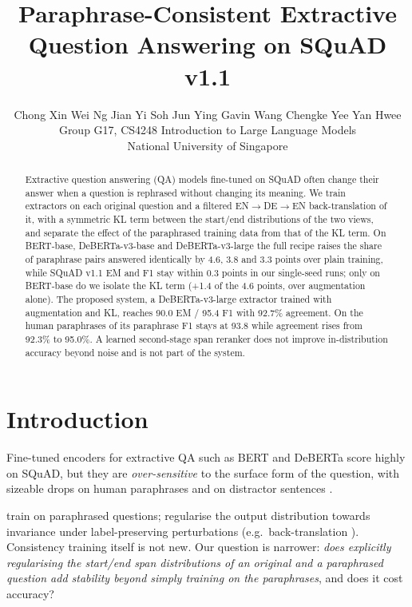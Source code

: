\documentclass[11pt]{article}
\title{Paraphrase-Consistent Extractive Question Answering on SQuAD v1.1}
\author{Chong Xin Wei \quad Ng Jian Yi \quad Soh Jun Ying Gavin \quad Wang Chengke \quad Yee Yan Hwee \\
  Group G17, CS4248 Introduction to Large Language Models \\
  National University of Singapore}
\date{}
\begin{document}
\maketitle

\begin{abstract}
Extractive question answering (QA) models fine-tuned on SQuAD often change their answer when a question is rephrased without changing its meaning. We train extractors on each original question and a filtered EN$\rightarrow$DE$\rightarrow$EN back-translation of it, with a symmetric KL term between the start/end distributions of the two views, and separate the effect of the paraphrased training data from that of the KL term. On BERT-base, DeBERTa-v3-base and DeBERTa-v3-large the full recipe raises the share of paraphrase pairs answered identically by 4.6, 3.8 and 3.3 points over plain training, while SQuAD v1.1 EM and F1 stay within 0.3 points in our single-seed runs; only on BERT-base do we isolate the KL term (+1.4 of the 4.6 points, over augmentation alone). The proposed system, a DeBERTa-v3-large extractor trained with augmentation and KL, reaches 90.0 EM / 95.4 F1 with 92.7\% agreement. On the human paraphrases of \citet{gan2019improving} its paraphrase F1 stays at 93.8 while agreement rises from 92.3\% to 95.0\%. A learned second-stage span reranker does not improve in-distribution accuracy beyond noise and is not part of the system.
\end{abstract}

\section{Introduction}
Fine-tuned encoders for extractive QA \citep{rajpurkar2016squad} such as BERT \citep{devlin2019bert} and DeBERTa \citep{he2021deberta,he2023debertav3} score highly on SQuAD, but they are \emph{over-sensitive} to the surface form of the question, with sizeable drops on human paraphrases \citep{gan2019improving} and on distractor sentences \citep{jia2017adversarial}.

\citet{gan2019improving} train on paraphrased questions; \citet{xie2020unsupervised} regularise the output distribution towards invariance under label-preserving perturbations (e.g.\ back-translation \citep{sennrich2016improving}). Consistency training itself is not new. Our question is narrower: \emph{does explicitly regularising the start/end span distributions of an original and a paraphrased question add stability beyond simply training on the paraphrases}, and does it cost accuracy?
\end{document}
